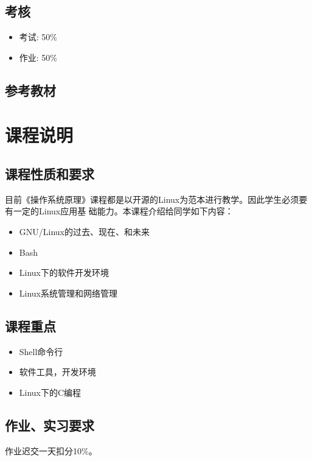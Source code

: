 \documentclass{wx672ctexart}
\begin{document}
\subsection{考核}

\begin{itemize}
\item 考试: 50\%
\item 作业: 50\%
\end{itemize}

\subsection{参考教材}

\nocite{cooper10bash,web:debianhandbook}
\printbibliography[heading=none]{}


\section{课程说明}

\subsection{课程性质和要求}

目前《操作系统原理》课程都是以开源的Linux为范本进行教学。因此学生必须要有一定的Linux应用基
础能力。本课程介绍给同学如下内容：
\begin{itemize}
\item GNU/Linux的过去、现在、和未来
\item Bash
\item Linux下的软件开发环境
\item Linux系统管理和网络管理
\end{itemize}

\subsection{课程重点}

\begin{itemize}
\item Shell命令行
\item 软件工具，开发环境
\item Linux下的C编程
\end{itemize}

\subsection{作业、实习要求}
作业迟交一天扣分10\%。
\end{document}
